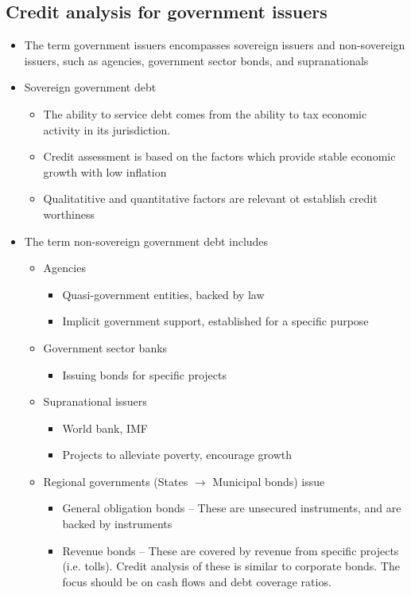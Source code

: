 \documentclass[../notes_compiled.tex]{subfiles}
\begin{document}
\subsection{Credit analysis for government issuers}
\begin{itemize}
\item The term government issuers encompasses sovereign issuers and non-sovereign issuers, such as agencies, government sector bonds, and supranationals
\item Sovereign government debt
\begin{itemize}
\item The ability to service debt comes from the ability to tax economic activity in its jurisdiction.
\item Credit assessment is based on the factors which provide stable economic growth with low inflation
\item Qualitatitive and quantitative factors are relevant ot establish credit worthiness
\end{itemize}

\item The term non-sovereign government debt includes
\begin{itemize}
\item Agencies
\begin{itemize}
\item Quasi-government entities, backed by law
\item Implicit government support, established for a specific purpose
\end{itemize}
\item Government sector banks
\begin{itemize}
\item Issuing bonds for specific projects
\end{itemize}
\item Supranational issuers
\begin{itemize}
\item World bank, IMF
\item Projects to alleviate poverty, encourage growth
\end{itemize}
\item Regional governments (States $\rightarrow$ Municipal bonds) issue
\begin{itemize}
\item General obligation bonds -- These are unsecured instruments, and are backed by instruments
\item Revenue bonds -- These are covered by revenue from specific projects (i.e. tolls). Credit analysis of these is similar to corporate bonds. The focus should be on cash flows and debt coverage ratios.
\end{itemize}
\end{itemize}


\end{itemize}
\end{document}
